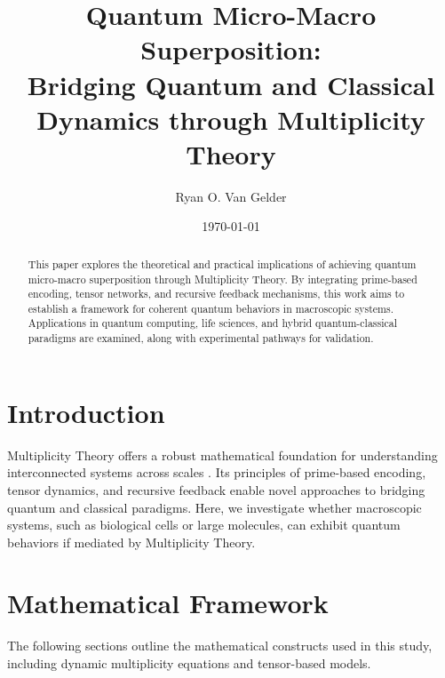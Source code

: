 \documentclass{article}
\theoremstyle{plain}
\begin{document}
\title{Quantum Micro-Macro Superposition: \\ Bridging Quantum and Classical Dynamics through Multiplicity Theory}

\author{Ryan O. Van Gelder}
\date{\today}
\maketitle

\begin{abstract}
This paper explores the theoretical and practical implications of achieving quantum micro-macro superposition through Multiplicity Theory. By integrating prime-based encoding, tensor networks, and recursive feedback mechanisms, this work aims to establish a framework for coherent quantum behaviors in macroscopic systems. Applications in quantum computing, life sciences, and hybrid quantum-classical paradigms are examined, along with experimental pathways for validation.
\end{abstract}

\section{Introduction}
Multiplicity Theory offers a robust mathematical foundation for understanding interconnected systems across scales \cite{van2024multiplicity}. Its principles of prime-based encoding, tensor dynamics, and recursive feedback enable novel approaches to bridging quantum and classical paradigms. Here, we investigate whether macroscopic systems, such as biological cells or large molecules, can exhibit quantum behaviors if mediated by Multiplicity Theory.

\section{Mathematical Framework}
The following sections outline the mathematical constructs used in this study, including dynamic multiplicity equations and tensor-based models.
\end{document}
